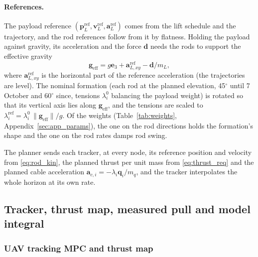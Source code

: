 \paragraph{References.} The payload reference $(\mathbf{p}_L^{\mathrm{ref}}, \mathbf{v}_L^{\mathrm{ref}},
\mathbf{a}_L^{\mathrm{ref}})$ comes from the lift schedule and the trajectory, and the rod references
follow from it by flatness. Holding the payload against gravity, its acceleration and the force
$\mathbf{d}$ needs the rods to support the effective gravity
\begin{equation}
    \mathbf{g}_{\mathrm{eff}} = g\mathbf{e}_3 + \mathbf{a}_{L,xy}^{\mathrm{ref}} - \mathbf{d}/m_L ,
\end{equation}
where $\mathbf{a}_{L,xy}^{\mathrm{ref}}$ is the horizontal part of the reference acceleration (the
trajectories are level). The nominal formation (each rod at the planned elevation, 45$^\circ$ until 7 October and 60$^\circ$ since, tensions
$\lambda_i^{0}$ balancing the payload weight) is rotated so that its vertical axis lies along
$\mathbf{g}_{\mathrm{eff}}$, and the tensions are scaled to $\lambda_i^{\mathrm{ref}} = \lambda_i^{0}\,
\|\mathbf{g}_{\mathrm{eff}}\| / g$. Of the weights (Table~\ref{tab:weights}, Appendix~\ref{sec:app_params}),
the one on the rod directions holds the formation's shape and the one on the rod rates damps rod swing.

The planner sends each tracker, at every node, its reference position and velocity from \eqref{eq:rod_kin}, the
planned thrust per unit mass from \eqref{eq:thrust_req} and the planned cable acceleration
$\mathbf{a}_{c,i} = -\lambda_i \mathbf{q}_i / m_q$, and the tracker interpolates the whole horizon at its own rate.

\subsection{Tracker, thrust map, measured pull and model integral}
\label{sec:tracker}

\subsubsection{UAV tracking MPC and thrust map}

